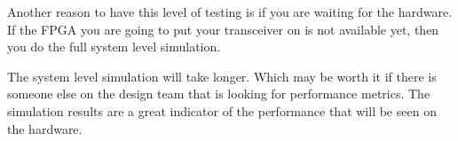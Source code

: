 Another reason to have this level of testing is if you are waiting for the hardware. If the \ac{FPGA} you are going to put your transceiver on is not available yet, then you do the full system level simulation.

The system level simulation will take longer. Which may be worth it if there is someone else on the design team that is looking for performance metrics. The simulation results are a great indicator of the performance that will be seen on the hardware.

	
	